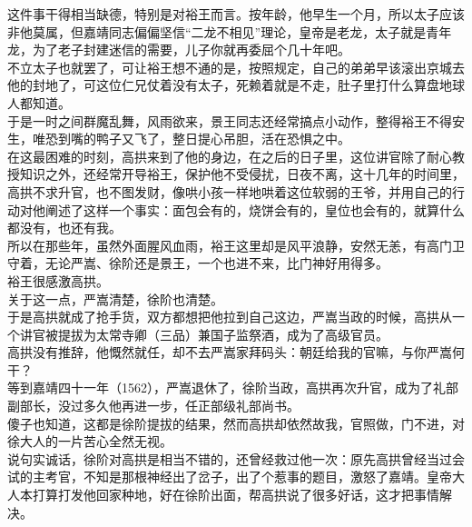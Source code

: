 \begin{multicols}{\theparacolNo}
这件事干得相当缺德，特别是对裕王而言。按年龄，他早生一个月，所以太子应该非他莫属，但嘉靖同志偏偏坚信“二龙不相见”理论，皇帝是老龙，太子就是青年龙，为了老子封建迷信的需要，儿子你就再委屈个几十年吧。\\

不立太子也就罢了，可让裕王想不通的是，按照规定，自己的弟弟早该滚出京城去他的封地了，可这位仁兄仗着没有太子，死赖着就是不走，肚子里打什么算盘地球人都知道。\\

于是一时之间群魔乱舞，风雨欲来，景王同志还经常搞点小动作，整得裕王不得安生，唯恐到嘴的鸭子又飞了，整日提心吊胆，活在恐惧之中。\\

在这最困难的时刻，高拱来到了他的身边，在之后的日子里，这位讲官除了耐心教授知识之外，还经常开导裕王，保护他不受侵扰，日夜不离，这十几年的时间里，高拱不求升官，也不图发财，像哄小孩一样地哄着这位软弱的王爷，并用自己的行动对他阐述了这样一个事实：面包会有的，烧饼会有的，皇位也会有的，就算什么都没有，也还有我。\\

所以在那些年，虽然外面腥风血雨，裕王这里却是风平浪静，安然无恙，有高门卫守着，无论严嵩、徐阶还是景王，一个也进不来，比门神好用得多。\\

裕王很感激高拱。\\

关于这一点，严嵩清楚，徐阶也清楚。\\

于是高拱就成了抢手货，双方都想把他拉到自己这边，严嵩当政的时候，高拱从一个讲官被提拔为太常寺卿（三品）兼国子监祭酒，成为了高级官员。\\

高拱没有推辞，他慨然就任，却不去严嵩家拜码头：朝廷给我的官嘛，与你严嵩何干？\\

等到嘉靖四十一年（1562），严嵩退休了，徐阶当政，高拱再次升官，成为了礼部副部长，没过多久他再进一步，任正部级礼部尚书。\\

傻子也知道，这都是徐阶提拔的结果，然而高拱却依然故我，官照做，门不进，对徐大人的一片苦心全然无视。\\

说句实诚话，徐阶对高拱是相当不错的，还曾经救过他一次：原先高拱曾经当过会试的主考官，不知是那根神经出了岔子，出了个惹事的题目，激怒了嘉靖。皇帝大人本打算打发他回家种地，好在徐阶出面，帮高拱说了很多好话，这才把事情解决。\\


\end{multicols}
